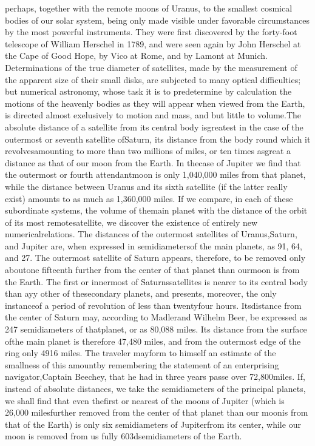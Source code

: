 perhaps, together with the remote moons of Uranus, to the smallest cosmical bodies of our solar system, being only made visible under favorable circumstances by the most powerful instruments. They were first discovered by the forty-foot telescope of William Herschel in 1789, and were seen again by John Herschel at the Cape of Good Hope, by Vico at Rome, and by Lamont at Munich. Determinations of the true diameter of satellites, made by the measurement of the apparent size of their small disks, are subjected to many optical difficulties; but numerical astronomy, whose task it is to predetermine by calculation the motions of the heavenly bodies as they will appear when viewed from the Earth, is directed almost exelusively to motion and mass, and but little to volume.The absolute distance of a satellite from its central body isgreatest in the case of the outermost or seventh satellite ofSaturn, its distance from the body round which it revolvesamounting to more than two millions of miles, or ten times asgreat a distance as that of our moon from the Earth. In thecase of Jupiter we find that the outermost or fourth attendantmoon is only 1,040,000 miles from that planet, while the distance between Uranus and its sixth satellite (if the latter really exist) amounts to as much as 1,360,000 miles. If we compare, in each of these subordinate systems, the volume of themain planet with the distance of the orbit of its most remotesatellite, we discover the existence of entirely new numericalrelations. The distances of the outermost satellites of Uranus,Saturn, and Jupiter are, when expressed in semidiametersof the main planets, as 91, 64, and 27. The outermost satellite of Saturn appears, therefore, to be removed only aboutone fifteenth further from the center of that planet than ourmoon is from the Earth. The first or innermost of Saturnssatellites is nearer to its central body than ayy other of thesecondary planets, and presents, moreover, the only instanceof a period of revolution of less than twentyfour hours. Itsdistance from the center of Saturn may, according to Madlerand Wilhelm Beer, be expressed as 247 semidiameters of thatplanet, or as 80,088 miles. Its distance from the surface ofthe main planet is therefore 47,480 miles, and from the outermost edge of the ring only 4916 miles. The traveler mayform to himself an estimate of the smallness of this amountby remembering the statement of an enterprising navigator,Captain Beechey, that he had in three years passe over 72,800miles. If, instead of absolute distances, we take the semidiameters of the principal planets, we shall find that even thefirst or nearest of the moons of Jupiter (which is 26,000 milesfurther removed from the center of that planet than our moonis from that of the Earth) is only six semidiameters of Jupiterfrom its center, while our moon is removed from us fully 603dsemidiameters of the Earth.

